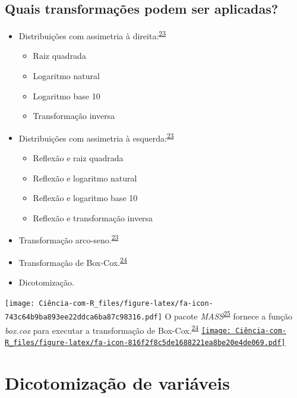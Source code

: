 \documentclass[
]{book}
\begin{document}
\hypertarget{quais-transformauxe7uxf5es-podem-ser-aplicadas}{%
\subsection{Quais transformações podem ser aplicadas?}\label{quais-transformauxe7uxf5es-podem-ser-aplicadas}}

\begin{itemize}
\item
  Distribuições com assimetria à direita:\textsuperscript{\protect\hyperlink{ref-osborne2010}{23}}

  \begin{itemize}
  \item
    Raiz quadrada
  \item
    Logaritmo natural
  \item
    Logaritmo base 10
  \item
    Transformação inversa
  \end{itemize}
\item
  Distribuições com assimetria à esquerda:\textsuperscript{\protect\hyperlink{ref-osborne2010}{23}}

  \begin{itemize}
  \item
    Reflexão e raiz quadrada
  \item
    Reflexão e logaritmo natural
  \item
    Reflexão e logaritmo base 10
  \item
    Reflexão e transformação inversa
  \end{itemize}
\item
  Transformação arco-seno.\textsuperscript{\protect\hyperlink{ref-osborne2010}{23}}
\item
  Transformação de Box-Cox.\textsuperscript{\protect\hyperlink{ref-box1964}{24}}
\item
  Dicotomização.
\end{itemize}

\texttt{[image: Ciência-com-R\_files/figure-latex/fa-icon-743c64b9ba893ee22ddca6ba87c98316.pdf]} O pacote \emph{MASS}\textsuperscript{\protect\hyperlink{ref-MASS}{25}} fornece a função \emph{box.cox} para executar a transformação de Box-Cox.\textsuperscript{\protect\hyperlink{ref-box1964}{24}} \href{https://cran.r-project.org/web/packages/MASS/index.html}{\texttt{[image: Ciência-com-R\_files/figure-latex/fa-icon-816f2f8c5de1688221ea8be20e4de069.pdf]}}

\hypertarget{dicotomizacao}{%
\section{Dicotomização de variáveis}\label{dicotomizacao}}
\end{document}
